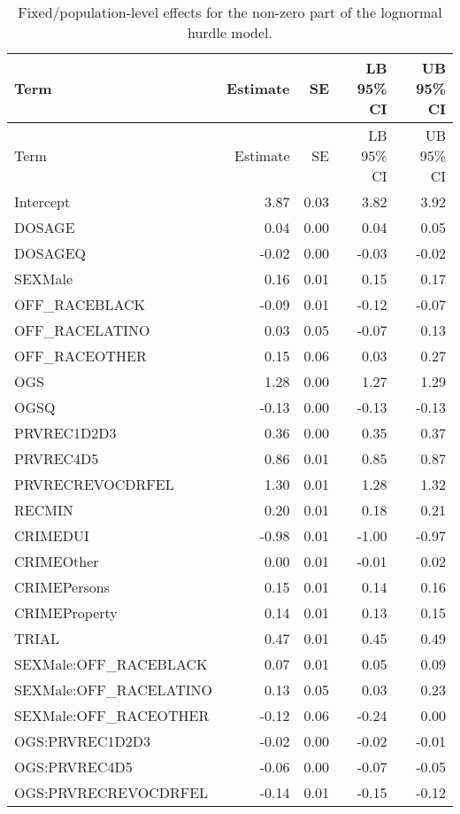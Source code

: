 \documentclass[
  letterpaper,
  DIV=11,
  numbers=noendperiod]{scrartcl}
\begin{document}
\hypertarget{tbl-brms-hurdle-model-summary-2}{}
\begin{longtable}[]{@{}lrrrr@{}}
\caption{\label{tbl-brms-hurdle-model-summary-2}Fixed/population-level
effects for the non-zero part of the lognormal hurdle
model.}\tabularnewline
\toprule\noalign{}
Term & Estimate & SE & LB 95\% CI & UB 95\% CI \\
\midrule\noalign{}
\endfirsthead
\toprule\noalign{}
Term & Estimate & SE & LB 95\% CI & UB 95\% CI \\
\midrule\noalign{}
\endhead
\bottomrule\noalign{}
\endlastfoot
Intercept & 3.87 & 0.03 & 3.82 & 3.92 \\
DOSAGE & 0.04 & 0.00 & 0.04 & 0.05 \\
DOSAGEQ & -0.02 & 0.00 & -0.03 & -0.02 \\
SEXMale & 0.16 & 0.01 & 0.15 & 0.17 \\
OFF\_RACEBLACK & -0.09 & 0.01 & -0.12 & -0.07 \\
OFF\_RACELATINO & 0.03 & 0.05 & -0.07 & 0.13 \\
OFF\_RACEOTHER & 0.15 & 0.06 & 0.03 & 0.27 \\
OGS & 1.28 & 0.00 & 1.27 & 1.29 \\
OGSQ & -0.13 & 0.00 & -0.13 & -0.13 \\
PRVREC1D2D3 & 0.36 & 0.00 & 0.35 & 0.37 \\
PRVREC4D5 & 0.86 & 0.01 & 0.85 & 0.87 \\
PRVRECREVOCDRFEL & 1.30 & 0.01 & 1.28 & 1.32 \\
RECMIN & 0.20 & 0.01 & 0.18 & 0.21 \\
CRIMEDUI & -0.98 & 0.01 & -1.00 & -0.97 \\
CRIMEOther & 0.00 & 0.01 & -0.01 & 0.02 \\
CRIMEPersons & 0.15 & 0.01 & 0.14 & 0.16 \\
CRIMEProperty & 0.14 & 0.01 & 0.13 & 0.15 \\
TRIAL & 0.47 & 0.01 & 0.45 & 0.49 \\
SEXMale:OFF\_RACEBLACK & 0.07 & 0.01 & 0.05 & 0.09 \\
SEXMale:OFF\_RACELATINO & 0.13 & 0.05 & 0.03 & 0.23 \\
SEXMale:OFF\_RACEOTHER & -0.12 & 0.06 & -0.24 & 0.00 \\
OGS:PRVREC1D2D3 & -0.02 & 0.00 & -0.02 & -0.01 \\
OGS:PRVREC4D5 & -0.06 & 0.00 & -0.07 & -0.05 \\
OGS:PRVRECREVOCDRFEL & -0.14 & 0.01 & -0.15 & -0.12 \\
\end{longtable}
\end{document}
